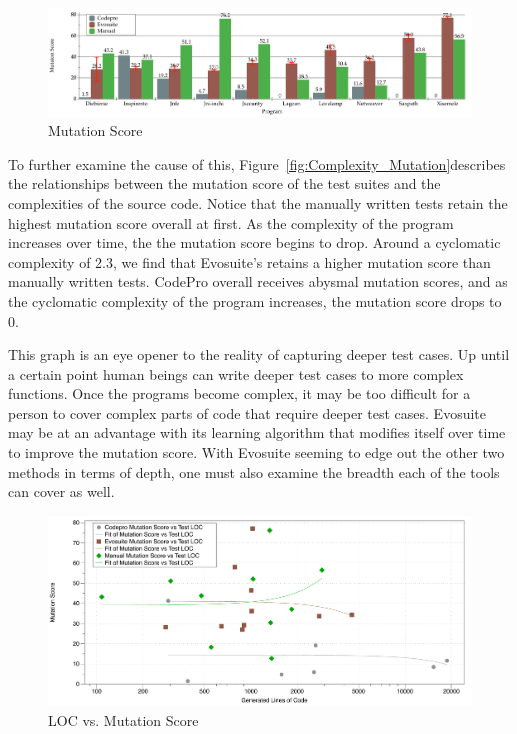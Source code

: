 \documentclass[conference]{IEEEtran}
\begin{document}
\begin{figure}[!t]
\centering
  \includegraphics[width=\textwidth]{Mutation_Score}
    \caption{Mutation Score}
  \label{fig:Mutation_Score}
\end{figure}

To further examine the cause of this, Figure~\ref{fig:Complexity_Mutation}describes the relationships between the mutation score of the test suites and the complexities of the source code. Notice that the manually written tests retain the highest mutation score overall at first. As the complexity of the program increases over time, the the mutation score begins to drop. Around a cyclomatic complexity of 2.3, we find that Evosuite's retains a higher mutation score than manually written tests. CodePro overall receives abysmal mutation scores, and as the cyclomatic complexity of the program increases, the mutation score drops to 0.

This graph is an eye opener to the reality of capturing deeper test cases. Up until a certain point human beings can write deeper test cases to more complex functions. Once the programs become complex, it may be too difficult for a person to cover complex parts of code that require deeper test cases. Evosuite may be at an advantage with its learning algorithm that modifies itself over time to improve the mutation score. With Evosuite seeming to edge out the other two methods in terms of depth, one must also examine the breadth each of the tools can cover as well.

\begin{figure}[!t]
\centering
  \includegraphics[width=\textwidth]{LOC_Mutation}
    \caption{LOC vs. Mutation Score}
  \label{fig:LOC_Mutation}
\end{figure}
\end{document}
